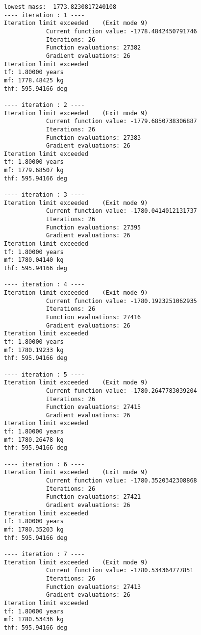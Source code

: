 \documentclass[11pt]{article}
\begin{document}
    \begin{Verbatim}[commandchars=\\\{\}]
lowest mass:  1773.8230817240108
---- iteration : 1 ----
Iteration limit exceeded    (Exit mode 9)
            Current function value: -1778.4842450791746
            Iterations: 26
            Function evaluations: 27382
            Gradient evaluations: 26
Iteration limit exceeded
tf: 1.80000 years
mf: 1778.48425 kg
thf: 595.94166 deg

---- iteration : 2 ----
Iteration limit exceeded    (Exit mode 9)
            Current function value: -1779.6850738306887
            Iterations: 26
            Function evaluations: 27383
            Gradient evaluations: 26
Iteration limit exceeded
tf: 1.80000 years
mf: 1779.68507 kg
thf: 595.94166 deg

---- iteration : 3 ----
Iteration limit exceeded    (Exit mode 9)
            Current function value: -1780.0414012131737
            Iterations: 26
            Function evaluations: 27395
            Gradient evaluations: 26
Iteration limit exceeded
tf: 1.80000 years
mf: 1780.04140 kg
thf: 595.94166 deg

---- iteration : 4 ----
Iteration limit exceeded    (Exit mode 9)
            Current function value: -1780.1923251062935
            Iterations: 26
            Function evaluations: 27416
            Gradient evaluations: 26
Iteration limit exceeded
tf: 1.80000 years
mf: 1780.19233 kg
thf: 595.94166 deg

---- iteration : 5 ----
Iteration limit exceeded    (Exit mode 9)
            Current function value: -1780.2647783039204
            Iterations: 26
            Function evaluations: 27415
            Gradient evaluations: 26
Iteration limit exceeded
tf: 1.80000 years
mf: 1780.26478 kg
thf: 595.94166 deg

---- iteration : 6 ----
Iteration limit exceeded    (Exit mode 9)
            Current function value: -1780.3520342308868
            Iterations: 26
            Function evaluations: 27421
            Gradient evaluations: 26
Iteration limit exceeded
tf: 1.80000 years
mf: 1780.35203 kg
thf: 595.94166 deg

---- iteration : 7 ----
Iteration limit exceeded    (Exit mode 9)
            Current function value: -1780.534364777851
            Iterations: 26
            Function evaluations: 27413
            Gradient evaluations: 26
Iteration limit exceeded
tf: 1.80000 years
mf: 1780.53436 kg
thf: 595.94166 deg


    \end{Verbatim}
\end{document}
